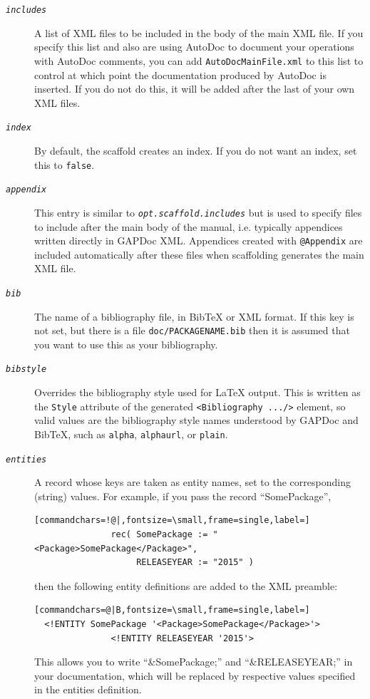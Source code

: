 \documentclass[a4paper,11pt]{report}
\begin{document}
{{{\begin{description}
\begin{description}
 
\begin{description}
\item[{\mbox{\texttt{\mdseries\slshape includes}}}]  A list of XML files to be included in the body of the main XML file. If you
specify this list and also are using \textsf{AutoDoc} to document your operations with \textsf{AutoDoc} comments, you can add \texttt{{\textunderscore}AutoDocMainFile.xml} to this list to control at which point the documentation produced by \textsf{AutoDoc} is inserted. If you do not do this, it will be added after the last of your
own XML files. 
\item[{\mbox{\texttt{\mdseries\slshape index}}}]  By default, the scaffold creates an index. If you do not want an index, set
this to \texttt{false}. 
\item[{\mbox{\texttt{\mdseries\slshape appendix}}}]  This entry is similar to \mbox{\texttt{\mdseries\slshape opt.scaffold.includes}} but is used to specify files to include after the main body of the manual,
i.e. typically appendices written directly in \textsf{GAPDoc} XML. Appendices created with \texttt{@Appendix} are included automatically after these files when scaffolding generates the
main XML file. 
\item[{\mbox{\texttt{\mdseries\slshape bib}}}]  The name of a bibliography file, in BibTeX or XML format. If this key is not
set, but there is a file \texttt{doc/PACKAGENAME.bib} then it is assumed that you want to use this as your bibliography. 
\item[{\mbox{\texttt{\mdseries\slshape bibstyle}}}]  Overrides the bibliography style used for LaTeX output. This is written as the \texttt{Style} attribute of the generated \texttt{{\textless}Bibliography .../{\textgreater}} element, so valid values are the bibliography style names understood by \textsf{GAPDoc} and BibTeX, such as \texttt{alpha}, \texttt{alphaurl}, or \texttt{plain}. 
\item[{\mbox{\texttt{\mdseries\slshape entities}}}]  A record whose keys are taken as entity names, set to the corresponding
(string) values. For example, if you pass the record ``SomePackage'', 
\begin{Verbatim}[commandchars=!@|,fontsize=\small,frame=single,label=]
               rec( SomePackage := "<Package>SomePackage</Package>",
                    RELEASEYEAR := "2015" )
\end{Verbatim}
 then the following entity definitions are added to the XML preamble: 
\begin{Verbatim}[commandchars=@|B,fontsize=\small,frame=single,label=]
  <!ENTITY SomePackage '<Package>SomePackage</Package>'>
               <!ENTITY RELEASEYEAR '2015'>
\end{Verbatim}
 This allows you to write ``\&SomePackage;'' and ``\&RELEASEYEAR;'' in your documentation, which will be replaced by respective values specified
in the entities definition. 


\end{description}
\end{description}
\end{description}}}}
\end{document}
